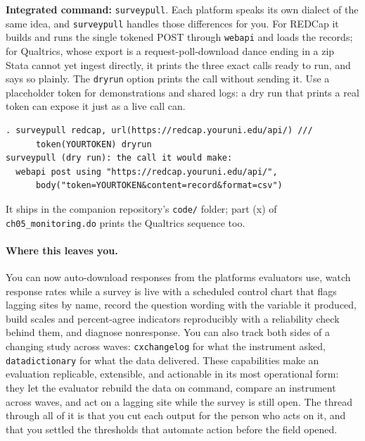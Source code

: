 \begin{kaobox}[frametitle=Package Integration: \texttt{surveypull}]
\textbf{Integrated command:} \texttt{surveypull}. Each platform speaks its own dialect of the same idea, and \texttt{surveypull} handles those differences for you. For REDCap it builds and runs the single tokened POST through \texttt{webapi} and loads the records; for Qualtrics, whose export is a request-poll-download dance ending in a zip Stata cannot yet ingest directly, it prints the three exact calls ready to run, and says so plainly. The \texttt{dryrun} option prints the call without sending it. Use a placeholder token for demonstrations and shared logs: a dry run that prints a real token can expose it just as a live call can.
\par
{\footnotesize
\begin{verbatim}
. surveypull redcap, url(https://redcap.youruni.edu/api/) ///
      token(YOURTOKEN) dryrun
surveypull (dry run): the call it would make:
  webapi post using "https://redcap.youruni.edu/api/",
      body("token=YOURTOKEN&content=record&format=csv")
\end{verbatim}
}
It ships in the companion repository's \texttt{code/} folder; part (x) of \texttt{ch05\_monitoring.do} prints the Qualtrics sequence too.
\end{kaobox}

\paragraph{Where this leaves you.} You can now auto-download responses from the platforms evaluators use, watch response rates while a survey is live with a scheduled control chart that flags lagging sites by name, record the question wording with the variable it produced, build scales and percent-agree indicators reproducibly with a reliability check behind them, and diagnose nonresponse. You can also track both sides of a changing study across waves: \texttt{cxchangelog} for what the instrument asked, \texttt{datadictionary} for what the data delivered. These capabilities make an evaluation replicable, extensible, and actionable in its most operational form: they let the evaluator rebuild the data on command, compare an instrument across waves, and act on a lagging site while the survey is still open. The thread through all of it is that you cut each output for the person who acts on it, and that you settled the thresholds that automate action before the field opened.

